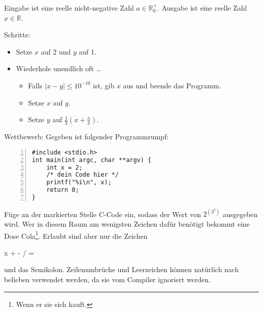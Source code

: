 \documentclass{uebungszettel}
\begin{document}
\begin{aufg}
    \begin{algorithm}[H]
        \caption{}
        Eingabe ist eine reelle nicht-negative Zahl $a \in \mathbb R_0^+$.
        Ausgabe ist eine reelle Zahl $x \in \mathbb R$.

        Schritte:
        \begin{itemize}
            \item
                Setze $x$ auf 2 und $y$ auf 1.
            \item
                Wiederhole unendlich oft …
                \begin{itemize}
                    \item 
                        Falls $|x - y| \leq 10^{-10}$ ist, gib $x$ aus und
                        beende das Programm.
                    \item
                        Setze $x$ auf $y$.
                    \item
                        Setze $y$ auf $\frac12 (x + \frac ax)$.
                \end{itemize}
        \end{itemize}
    \end{algorithm}
\end{aufg}

\begin{aufg}
Wettbewerb: Gegeben ist folgender Programmrumpf:
\begin{codelisting}
\begin{lstlisting}[numbers=left,numberstyle=\tiny,frame=tlrb]
#include <stdio.h>
int main(int argc, char **argv) {
	int x = 2;
	/* dein Code hier */
	printf("%i\n", x);
	return 0;
}
\end{lstlisting}
\end{codelisting}
Füge an der markierten Stelle C-Code ein, sodass der Wert von $2^{\left(3^3\right)}$ ausgegeben wird. Wer in diesem Raum am wenigsten Zeichen dafür benötigt bekommt eine Dose Cola\footnote{Wenn er sie sich kauft.}. Erlaubt sind aber nur die Zeichen 
\begin{center}
	x \quad + \quad - \quad * \quad / \quad =
\end{center}
und das Semikolon. Zeilenumbrüche und Leerzeichen können natürlich nach belieben verwendet werden, da sie vom Compiler ignoriert werden.
\end{aufg}
\end{document}
